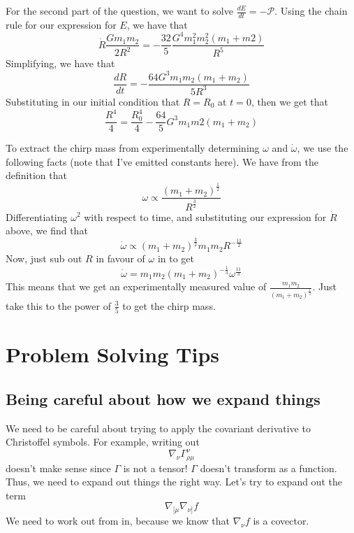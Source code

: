For the second part of the question, 
we want to solve $ \frac{  d E }{  dt }  =  -\mathcal{ P } $. 
Using the chain rule for our expression for $ E $, we have that 
\[
	\dot{ R } \frac{ G m_1 m_2 }{ 2 R ^ 2 }  =   - \frac{32}{5 } \frac{G ^ 4 m_1 ^ 2 m_2 ^ 2 \left( m_1 + m 2  \right)  }{ R ^ 5 } 
\]
Simplifying, we have that 
\[
	\frac{d R }{ d t }  =  - \frac{64 G ^ 3 m_1m_2 \left( m_1 +  m_2  \right)  }{ 5 R ^ 3 }
\] Substituting in our initial condition 
that $ R =R_0 $ at $ t = 0 $, then we 
get that 
\[
	\frac{R^ 4 }{ 4 }  = \frac{R_0^ 4 }{ 4 }  - \frac{64 }{ 5 } G ^ 3 m_1 m 2 \left( m_1 +  m_2 \right) 
\]

To extract the chirp mass from 
experimentally determining $ \omega $ and $ \dot{ \omega }  $, 
we use the following facts (note that I've emitted constants here).
We have from the definition that 
\[
	\omega \propto \frac{\left( m_1 + m_2  \right)  ^{ \frac{1}{2 } }}{ R ^{ \frac{3}{2 } } }
\] Differentiating $ \omega ^ 2 $ with respect to time, 
and substituting our expression for $ \dot{R }  $ above, 
we find that 
\[
	\dot{ \omega }  \propto \left( m_1 + m_2  \right)  ^{ \frac{3}{2 } } m_1 m_2 R ^{  - \frac{11 }{ 2 } } 
\] Now, just sub out $ R $ in favour of $ \omega $ in to get 
\[
	\dot{ \omega }  = m_1 m_2 \left( m_1 + m_ 2  \right)^{  - \frac{1}{3 } } \omega ^{ \frac{11}{3  }}  
	\] This means 
	that we get an experimentally measured value of $ \frac{m_1 m_2 }{  \left( m_1 + m_2  \right)  ^{ \frac{1}{3 } } } $. Just take this to the power of $ \frac{3}{5 } $ to get the chirp mass. 

\pagebreak

\section{Problem Solving Tips} 



\subsection{Being careful about how we expand things} 
We need to be careful about trying to 
apply the covariant derivative to Christoffel symbols. 
For example, writing out 
\[
 \nabla _ \nu \Gamma ^ \nu _{ \rho \mu } 
\]  doesn't make sense since $ \Gamma $ is not a tensor!
$ \Gamma $ doesn't transform as a function. 
Thus, we need to expand out things the right way. 
Let's try to expand out the 
term 
\[
	\nabla _{ [ \mu } \nabla _{ \nu ] } f 
\] We need to work out from in, because 
we know that $ \nabla _{ \nu } f $ is a covector. 

